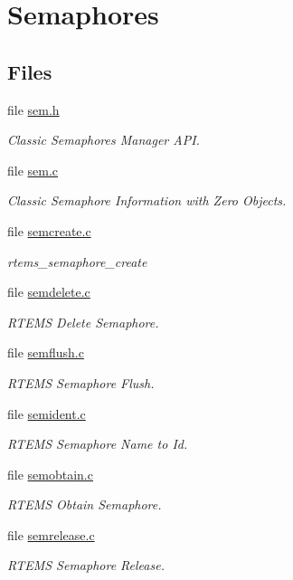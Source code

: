 \hypertarget{group__ClassicSem}{}\section{Semaphores}
\label{group__ClassicSem}
\subsection*{Files}
\begin{DoxyCompactItemize}
\item 
file \mbox{\hyperlink{sem_8h}{sem.\+h}}
\begin{DoxyCompactList}\small\item\em Classic Semaphores Manager A\+PI. \end{DoxyCompactList}\item 
file \mbox{\hyperlink{sem_8c}{sem.\+c}}
\begin{DoxyCompactList}\small\item\em Classic Semaphore Information with Zero Objects. \end{DoxyCompactList}\item 
file \mbox{\hyperlink{semcreate_8c}{semcreate.\+c}}
\begin{DoxyCompactList}\small\item\em rtems\+\_\+semaphore\+\_\+create \end{DoxyCompactList}\item 
file \mbox{\hyperlink{semdelete_8c}{semdelete.\+c}}
\begin{DoxyCompactList}\small\item\em R\+T\+E\+MS Delete Semaphore. \end{DoxyCompactList}\item 
file \mbox{\hyperlink{semflush_8c}{semflush.\+c}}
\begin{DoxyCompactList}\small\item\em R\+T\+E\+MS Semaphore Flush. \end{DoxyCompactList}\item 
file \mbox{\hyperlink{semident_8c}{semident.\+c}}
\begin{DoxyCompactList}\small\item\em R\+T\+E\+MS Semaphore Name to Id. \end{DoxyCompactList}\item 
file \mbox{\hyperlink{semobtain_8c}{semobtain.\+c}}
\begin{DoxyCompactList}\small\item\em R\+T\+E\+MS Obtain Semaphore. \end{DoxyCompactList}\item 
file \mbox{\hyperlink{semrelease_8c}{semrelease.\+c}}
\begin{DoxyCompactList}\small\item\em R\+T\+E\+MS Semaphore Release. \end{DoxyCompactList}\end{DoxyCompactItemize}
